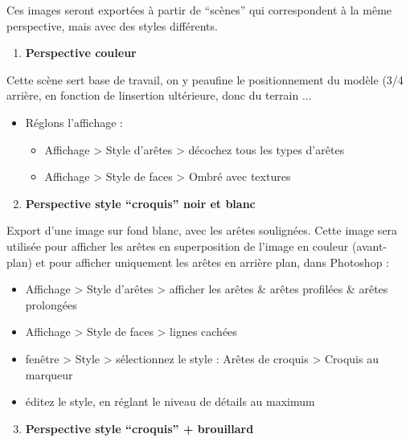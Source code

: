 \documentclass[a4paper,12pt,french]{sphinxmanual}
\begin{document}
Ces images seront exportées à partir de ``scènes'' qui correspondent à la même perspective, mais avec des styles différents.
\begin{enumerate}
\item {} 
\textbf{Perspective couleur}

\end{enumerate}

Cette scène sert base de travail, on y peaufine  le positionnement du modèle (3/4 arrière, en fonction de linsertion ultérieure, donc du terrain ...
\begin{itemize}
\item {} 
Réglons l'affichage :
\begin{itemize}
\item {} 
Affichage \textgreater{} Style d'arêtes \textgreater{} décochez tous les types d'arêtes

\item {} 
Affichage \textgreater{} Style de faces \textgreater{} Ombré avec textures

\end{itemize}

\end{itemize}
\begin{enumerate}
\setcounter{enumi}{1}
\item {} 
\textbf{Perspective style ``croquis'' noir et blanc}

\end{enumerate}

Export d'une image sur fond blanc, avec les arêtes soulignées. Cette image sera utilisée pour afficher les arêtes en superposition de l'image en couleur (avant-plan) et pour afficher uniquement les arêtes en arrière plan, dans Photoshop :
\begin{itemize}
\item {} 
Affichage \textgreater{} Style d'arêtes \textgreater{} afficher les arêtes \& arêtes profilées \& arêtes prolongées

\item {} 
Affichage \textgreater{} Style de faces \textgreater{} lignes cachées

\item {} 
fenêtre \textgreater{} Style \textgreater{} sélectionnez le style : Arêtes de croquis \textgreater{} Croquis au marqueur

\item {} 
éditez le style, en réglant le niveau de détails au maximum

\end{itemize}
\begin{enumerate}
\setcounter{enumi}{2}
\item {} 
\textbf{Perspective style ``croquis'' + brouillard}

\end{enumerate}
\end{document}
